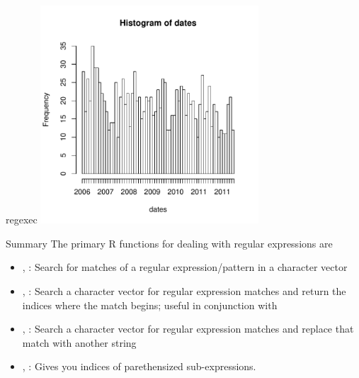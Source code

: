 \documentclass[aspectratio=169]{beamer}
\begin{document}
\begin{frame}[fragile]{regexec}
\includegraphics[height=3.2in]{homicide-month}
\end{frame}


\begin{frame}{Summary}
The primary R functions for dealing with regular expressions are
\begin{itemize}
\item {}, : Search for matches of a regular
  expression/pattern in a character vector
\item {}, : Search a character vector for regular
  expression matches and return the indices where the match begins;
  useful in conjunction with 
\item {}, : Search a character vector for regular
  expression matches and replace that match with another string
\item {}, : Gives you indices of parethensized sub-expressions.
\end{itemize}
\end{frame}
\end{document}
